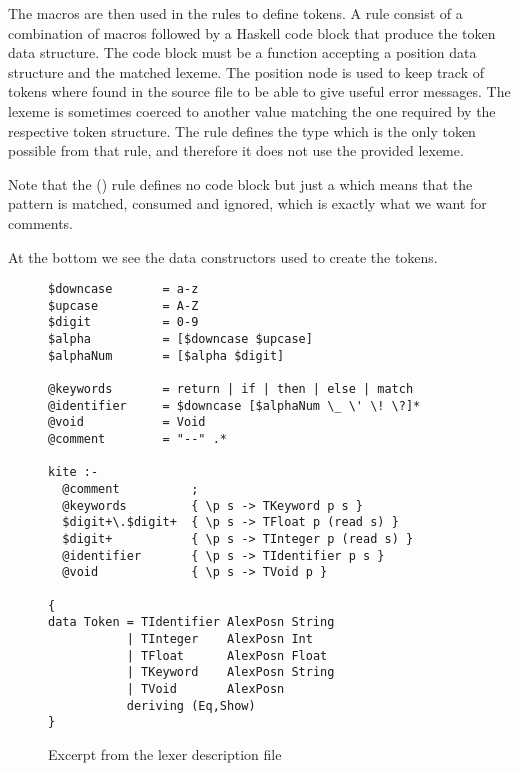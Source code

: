 The macros are then used in the rules to define tokens. A rule consist of a combination of macros followed by a Haskell code block that produce the token data structure. The code block must be a function accepting a position data structure and the matched lexeme. The position node is used to keep track of tokens where found in the source file to be able to give useful error messages. The lexeme is sometimes coerced to another value matching the one required by the respective token structure. The  rule defines the  type which is the only token possible from that rule, and therefore it does not use the provided lexeme.

Note that the () rule defines no code block but just a \code{;} which means that the pattern is matched, consumed and ignored, which is exactly what we want for comments.

At the bottom we see the data constructors used to create the tokens.

\begin{figure}[p]
\begin{lstlisting}
$downcase		= a-z
$upcase			= A-Z
$digit			= 0-9
$alpha			= [$downcase $upcase]
$alphaNum		= [$alpha $digit]

@keywords		= return | if | then | else | match
@identifier		= $downcase [$alphaNum \_ \' \! \?]*
@void           = Void
@comment		= "--" .*

kite :-
  @comment		    ;
  @keywords		    { \p s -> TKeyword p s }
  $digit+\.$digit+	{ \p s -> TFloat p (read s) }
  $digit+		    { \p s -> TInteger p (read s) }
  @identifier		{ \p s -> TIdentifier p s }
  @void		        { \p s -> TVoid p }

{
data Token = TIdentifier AlexPosn String
           | TInteger    AlexPosn Int
           | TFloat      AlexPosn Float
           | TKeyword    AlexPosn String
           | TVoid       AlexPosn
           deriving (Eq,Show)
}
\end{lstlisting}
\caption{Excerpt from the lexer description file}
\label{fig:lexer}
\end{figure}


